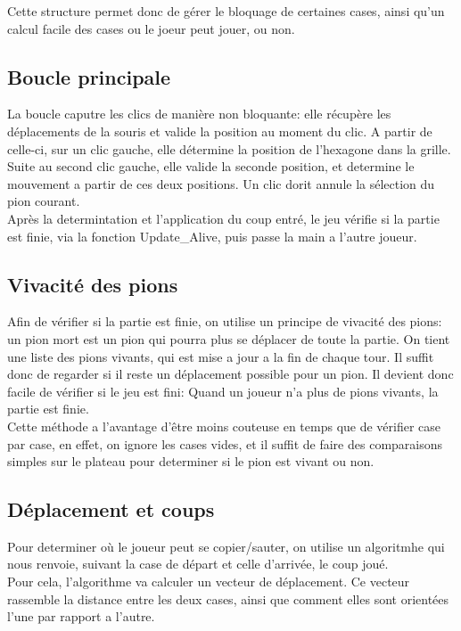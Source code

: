 \documentclass{report}
\begin{document}
		Cette structure permet donc de gérer le bloquage de certaines cases, ainsi qu'un calcul facile des cases ou le joeur peut jouer, ou non. 

	\subsection {Boucle principale}
		
	La boucle caputre les clics de manière non bloquante: elle récupère les déplacements de la souris et valide la position au moment du clic. A partir de celle-ci, sur un clic gauche, elle détermine la position de l'hexagone dans la grille. Suite au second clic gauche, elle valide la seconde position, et determine le mouvement a partir de ces deux positions. Un clic dorit annule la sélection du pion courant.\\

Après la determintation et l'application du coup entré, le jeu vérifie si la partie est finie, via la fonction Update\_Alive, puis passe la main a l'autre joueur. 
	\subsection{Vivacité des pions}

Afin de vérifier si la partie est finie, on utilise un principe de vivacité des pions: un pion mort est un pion qui pourra plus se déplacer de toute la partie. On tient une liste des pions vivants, qui est mise a jour a la fin de chaque tour. Il suffit donc de regarder si il reste un déplacement possible pour un pion. Il devient donc facile de vérifier si le jeu est fini: Quand un joueur n'a plus de pions vivants, la partie est finie.\\

Cette méthode a l'avantage d'être moins couteuse en temps que de vérifier case par case, en effet, on ignore les cases vides, et il suffit de faire des comparaisons simples sur le plateau pour determiner si le pion est vivant ou non.

	\subsection{Déplacement et coups}
	Pour determiner où le joueur peut se copier/sauter, on utilise un algoritmhe qui nous renvoie, suivant la case de départ et celle d'arrivée, le coup joué.\\
	
	Pour cela, l'algorithme va calculer un vecteur de déplacement. Ce vecteur rassemble la distance entre les deux cases, ainsi que comment elles sont orientées l'une par rapport a l'autre.\\
	
\end{document}
